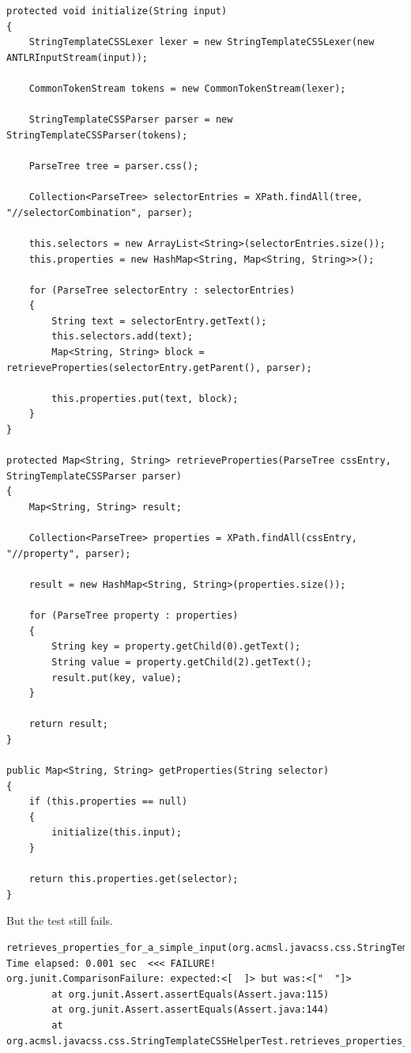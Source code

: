 \documentclass[11pt]{article}
\begin{document}
\begin{verbatim}
protected void initialize(String input)
{
    StringTemplateCSSLexer lexer = new StringTemplateCSSLexer(new ANTLRInputStream(input));

    CommonTokenStream tokens = new CommonTokenStream(lexer);

    StringTemplateCSSParser parser = new StringTemplateCSSParser(tokens);

    ParseTree tree = parser.css();

    Collection<ParseTree> selectorEntries = XPath.findAll(tree, "//selectorCombination", parser);

    this.selectors = new ArrayList<String>(selectorEntries.size());
    this.properties = new HashMap<String, Map<String, String>>();

    for (ParseTree selectorEntry : selectorEntries)
    {
        String text = selectorEntry.getText();
        this.selectors.add(text);
        Map<String, String> block = retrieveProperties(selectorEntry.getParent(), parser);

        this.properties.put(text, block);
    }
}

protected Map<String, String> retrieveProperties(ParseTree cssEntry, StringTemplateCSSParser parser)
{
    Map<String, String> result;

    Collection<ParseTree> properties = XPath.findAll(cssEntry, "//property", parser);

    result = new HashMap<String, String>(properties.size());

    for (ParseTree property : properties)
    {
        String key = property.getChild(0).getText();
        String value = property.getChild(2).getText();
        result.put(key, value);
    }

    return result;
}

public Map<String, String> getProperties(String selector)
{
    if (this.properties == null)
    {
        initialize(this.input);
    }

    return this.properties.get(selector);
}
\end{verbatim}

But the test still fails.

\begin{verbatim}
retrieves_properties_for_a_simple_input(org.acmsl.javacss.css.StringTemplateCSSHelperTest)  Time elapsed: 0.001 sec  <<< FAILURE!
org.junit.ComparisonFailure: expected:<[  ]> but was:<["  "]>
        at org.junit.Assert.assertEquals(Assert.java:115)
        at org.junit.Assert.assertEquals(Assert.java:144)
        at org.acmsl.javacss.css.StringTemplateCSSHelperTest.retrieves_properties_for_a_simple_input(StringTemplateCSSHelperTest.java:128)
\end{verbatim}
\end{document}

